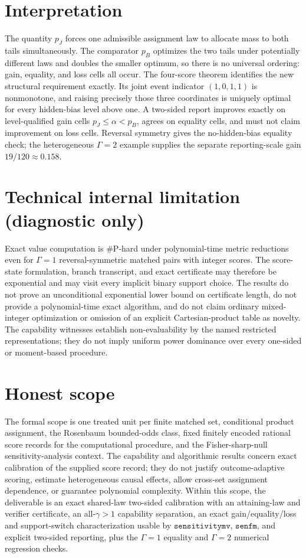 \documentclass{article}
\begin{document}
\section{Interpretation}

The quantity \(p_J\) forces one admissible assignment law to allocate mass to both tails simultaneously. The comparator \(p_B\) optimizes the two tails under potentially different laws and doubles the smaller optimum, so there is no universal ordering: gain, equality, and loss cells all occur. The four-score theorem identifies the new structural requirement exactly. Its joint event indicator \((1,0,1,1)\) is nonmonotone, and raising precisely those three coordinates is uniquely optimal for every hidden-bias level above one. A two-sided report improves exactly on level-qualified gain cells \(p_J\le\alpha<p_B\), agrees on equality cells, and must not claim improvement on loss cells. Reversal symmetry gives the no-hidden-bias equality check; the heterogeneous \(\Gamma=2\) example supplies the separate reporting-scale gain \(19/120\approx0.158\).

\section*{Technical internal limitation (diagnostic only)}

Exact value computation is \(\#\mathrm P\)-hard under polynomial-time metric reductions even for \(\Gamma=1\) reversal-symmetric matched pairs with integer scores. The score-state formulation, branch transcript, and exact certificate may therefore be exponential and may visit every implicit binary support choice. The results do not prove an unconditional exponential lower bound on certificate length, do not provide a polynomial-time exact algorithm, and do not claim ordinary mixed-integer optimization or omission of an explicit Cartesian-product table as novelty. The capability witnesses establish non-evaluability by the named restricted representations; they do not imply uniform power dominance over every one-sided or moment-based procedure.

\section{Honest scope}

The formal scope is one treated unit per finite matched set, conditional product assignment, the Rosenbaum bounded-odds class, fixed finitely encoded rational score records for the computational procedure, and the Fisher-sharp-null sensitivity-analysis context. The capability and algorithmic results concern exact calibration of the supplied score record; they do not justify outcome-adaptive scoring, estimate heterogeneous causal effects, allow cross-set assignment dependence, or guarantee polynomial complexity. Within this scope, the deliverable is an exact shared-law two-sided calibration with an attaining-law and verifier certificate, an all-\(\gamma>1\) capability separation, an exact gain/equality/loss and support-switch characterization usable by \(\texttt{sensitivitymv}\), \(\texttt{senfm}\), and explicit two-sided reporting, plus the \(\Gamma=1\) equality and \(\Gamma=2\) numerical regression checks.
\end{document}
